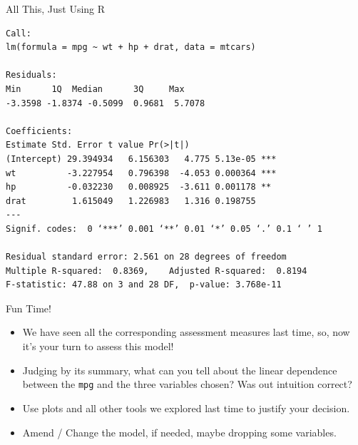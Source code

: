 \documentclass[aspectratio=169, 12pt, xcolor=table]{beamer}
\begin{document}
	\sectionframe
	
	\begin{frame}[fragile]{All This, Just Using R}
		
		
\begin{tiny}
		\begin{verbatim}
Call:
lm(formula = mpg ~ wt + hp + drat, data = mtcars)

Residuals:
Min      1Q  Median      3Q     Max 
-3.3598 -1.8374 -0.5099  0.9681  5.7078 

Coefficients:
Estimate Std. Error t value Pr(>|t|)    
(Intercept) 29.394934   6.156303   4.775 5.13e-05 ***
wt          -3.227954   0.796398  -4.053 0.000364 ***
hp          -0.032230   0.008925  -3.611 0.001178 ** 
drat         1.615049   1.226983   1.316 0.198755    
---
Signif. codes:  0 ‘***’ 0.001 ‘**’ 0.01 ‘*’ 0.05 ‘.’ 0.1 ‘ ’ 1

Residual standard error: 2.561 on 28 degrees of freedom
Multiple R-squared:  0.8369,    Adjusted R-squared:  0.8194 
F-statistic: 47.88 on 3 and 28 DF,  p-value: 3.768e-11
\end{verbatim}
\end{tiny}
	\end{frame}

	\begin{frame}{Fun Time!}
		\begin{itemize}
			\item We have seen all the corresponding assessment measures last time, so, now it's your turn to assess this model!
			\item Judging by its summary, what can you tell about the linear dependence between the \texttt{mpg} and the three variables chosen? Was out intuition correct?
			\item Use plots and all other tools we explored last time to justify your decision.
			\item Amend / Change the model, if needed, maybe dropping some variables.
		\end{itemize}
	\end{frame}
	
\end{document}
